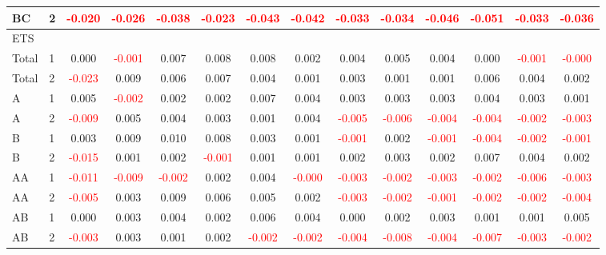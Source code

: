 \begin{table}[!htb]
{\begin{tabular}{llcccccccccccc}
BC & 2 & \textcolor{red}{-0.020} & \textcolor{red}{-0.026} & \textcolor{red}{-0.038} & \textcolor{red}{-0.023} & \textcolor{red}{-0.043} & \textcolor{red}{-0.042} & \textcolor{red}{-0.033} & \textcolor{red}{-0.034} & \textcolor{red}{-0.046} & \textcolor{red}{-0.051} & \textcolor{red}{-0.033} & \textcolor{red}{-0.036}\\
\hline
ETS &  &  &  &  &  &  &  &  &  &  &  &  & \\
\hline
Total & 1 & 0.000 & \textcolor{red}{-0.001} & 0.007 & 0.008 & 0.008 & 0.002 & 0.004 & 0.005 & 0.004 & 0.000 & \textcolor{red}{-0.001} & \textcolor{red}{-0.000}\\
Total & 2 & \textcolor{red}{-0.023} & 0.009 & 0.006 & 0.007 & 0.004 & 0.001 & 0.003 & 0.001 & 0.001 & 0.006 & 0.004 & 0.002\\
A & 1 & 0.005 & \textcolor{red}{-0.002} & 0.002 & 0.002 & 0.007 & 0.004 & 0.003 & 0.003 & 0.003 & 0.004 & 0.003 & 0.001\\
A & 2 & \textcolor{red}{-0.009} & 0.005 & 0.004 & 0.003 & 0.001 & 0.004 & \textcolor{red}{-0.005} & \textcolor{red}{-0.006} & \textcolor{red}{-0.004} & \textcolor{red}{-0.004} & \textcolor{red}{-0.002} & \textcolor{red}{-0.003}\\
B & 1 & 0.003 & 0.009 & 0.010 & 0.008 & 0.003 & 0.001 & \textcolor{red}{-0.001} & 0.002 & \textcolor{red}{-0.001} & \textcolor{red}{-0.004} & \textcolor{red}{-0.002} & \textcolor{red}{-0.001}\\
B & 2 & \textcolor{red}{-0.015} & 0.001 & 0.002 & \textcolor{red}{-0.001} & 0.001 & 0.001 & 0.002 & 0.003 & 0.002 & 0.007 & 0.004 & 0.002\\
AA & 1 & \textcolor{red}{-0.011} & \textcolor{red}{-0.009} & \textcolor{red}{-0.002} & 0.002 & 0.004 & \textcolor{red}{-0.000} & \textcolor{red}{-0.003} & \textcolor{red}{-0.002} & \textcolor{red}{-0.003} & \textcolor{red}{-0.002} & \textcolor{red}{-0.006} & \textcolor{red}{-0.003}\\
AA & 2 & \textcolor{red}{-0.005} & 0.003 & 0.009 & 0.006 & 0.005 & 0.002 & \textcolor{red}{-0.003} & \textcolor{red}{-0.002} & \textcolor{red}{-0.001} & \textcolor{red}{-0.002} & \textcolor{red}{-0.002} & \textcolor{red}{-0.004}\\
AB & 1 & 0.000 & 0.003 & 0.004 & 0.002 & 0.006 & 0.004 & 0.000 & 0.002 & 0.003 & 0.001 & 0.001 & 0.005\\
AB & 2 & \textcolor{red}{-0.003} & 0.003 & 0.001 & 0.002 & \textcolor{red}{-0.002} & \textcolor{red}{-0.002} & \textcolor{red}{-0.004} & \textcolor{red}{-0.008} & \textcolor{red}{-0.004} & \textcolor{red}{-0.007} & \textcolor{red}{-0.003} & \textcolor{red}{-0.002}\\

\end{tabular}}
\end{table}
